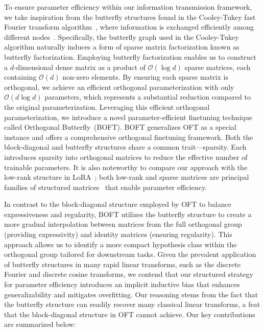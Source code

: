 To ensure parameter efficiency within our information transmission framework, we take inspiration from the butterfly structures found in the Cooley-Tukey fast Fourier transform algorithm~\cite{cooley1965algorithm}, where information is exchanged efficiently among different nodes~\cite{klasing1994broadcasting}. Specifically, the butterfly graph used in the Cooley-Tukey algorithm naturally induces a form of sparse matrix factorization known as butterfly factorization. Employing butterfly factorization enables us to construct a $d$-dimensional dense matrix as a product of $\mathcal{O}(\log d)$ sparse matrices, each containing $\mathcal{O}(d)$ non-zero elements. By ensuring each sparse matrix is orthogonal, we achieve an efficient orthogonal parameterization with only $\mathcal{O}(d \log d)$ parameters, which represents a substantial reduction compared to the original parameterization. Leveraging this efficient orthogonal parameterization, we introduce a novel parameter-efficient finetuning technique called Orthogonal Butterfly~(BOFT). BOFT generalizes OFT as a special instance and offers a comprehensive orthogonal finetuning framework. Both the block-diagonal and butterfly structures share a common trait—sparsity. Each introduces sparsity into orthogonal matrices to reduce the effective number of trainable parameters. It is also noteworthy to compare our approach with the low-rank structure in LoRA~\cite{hulora2022}; both low-rank and sparse matrices are principal families of structured matrices~\cite{candes2011robust} that enable parameter efficiency.

In contrast to the block-diagonal structure employed by OFT to balance expressiveness and regularity, BOFT utilizes the butterfly structure to create a more gradual interpolation between matrices from the full orthogonal group (providing expressivity) and identity matrices (ensuring regularity). This approach allows us to identify a more compact hypothesis class within the orthogonal group tailored for downstream tasks. Given the prevalent application of butterfly structures in many rapid linear transforms, such as the discrete Fourier and discrete cosine transforms, we contend that our structured strategy for parameter efficiency introduces an implicit inductive bias that enhances generalizability and mitigates overfitting. Our reasoning stems from the fact that the butterfly structure can readily recover many classical linear transforms, a feat that the block-diagonal structure in OFT cannot achieve. Our key contributions are summarized below:

